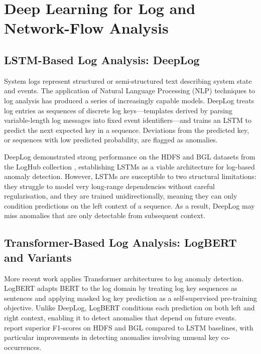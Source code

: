 \documentclass[12pt,a4paper]{report}
\begin{document}
\section{Deep Learning for Log and Network-Flow Analysis}
\label{sec:deeplearning}

\subsection{LSTM-Based Log Analysis: DeepLog}
\label{sec:deeplog}

System logs represent structured or semi-structured text describing system state and events. The application of Natural Language Processing (NLP) techniques to log analysis has produced a series of increasingly capable models. DeepLog \citep{du2017} treats log entries as sequences of discrete log keys---templates derived by parsing variable-length log messages into fixed event identifiers---and trains an LSTM to predict the next expected key in a sequence. Deviations from the predicted key, or sequences with low predicted probability, are flagged as anomalies.

DeepLog demonstrated strong performance on the HDFS and BGL datasets from the LogHub collection \citep{zhu2023}, establishing LSTMs as a viable architecture for log-based anomaly detection. However, LSTMs are susceptible to two structural limitations: they struggle to model very long-range dependencies without careful regularisation, and they are trained unidirectionally, meaning they can only condition predictions on the left context of a sequence. As a result, DeepLog may miss anomalies that are only detectable from subsequent context.

\subsection{Transformer-Based Log Analysis: LogBERT and Variants}
\label{sec:logbert}

More recent work applies Transformer architectures to log anomaly detection. LogBERT \citep{guo2021} adapts BERT to the log domain by treating log key sequences as sentences and applying masked log key prediction as a self-supervised pre-training objective. Unlike DeepLog, LogBERT conditions each prediction on both left and right context, enabling it to detect anomalies that depend on future events. \citet{guo2021} report superior F1-scores on HDFS and BGL compared to LSTM baselines, with particular improvements in detecting anomalies involving unusual key co-occurrences.
\end{document}
